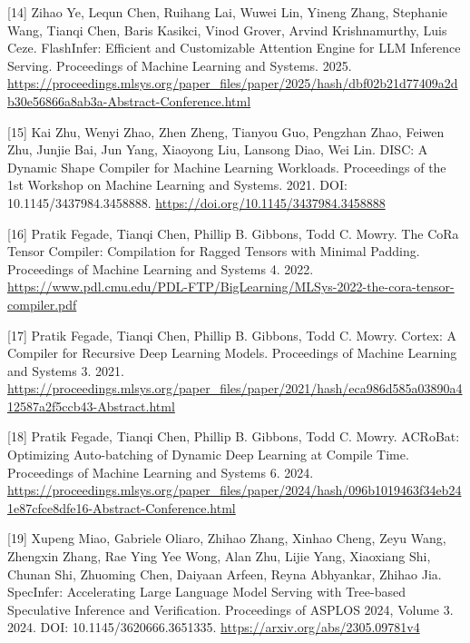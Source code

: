 \documentclass[UTF8,11pt,fontset=windows]{ctexart}
\begin{document}
\leavevmode{}%
{[}14{]} Zihao Ye, Lequn Chen, Ruihang Lai, Wuwei Lin, Yineng Zhang, Stephanie Wang, Tianqi Chen, Baris Kasikci, Vinod Grover, Arvind Krishnamurthy, Luis Ceze. FlashInfer: Efficient and Customizable Attention Engine for LLM Inference Serving. Proceedings of Machine Learning and Systems. 2025. \url{https://proceedings.mlsys.org/paper_files/paper/2025/hash/dbf02b21d77409a2db30e56866a8ab3a-Abstract-Conference.html}

\leavevmode{}%
{[}15{]} Kai Zhu, Wenyi Zhao, Zhen Zheng, Tianyou Guo, Pengzhan Zhao, Feiwen Zhu, Junjie Bai, Jun Yang, Xiaoyong Liu, Lansong Diao, Wei Lin. DISC: A Dynamic Shape Compiler for Machine Learning Workloads. Proceedings of the 1st Workshop on Machine Learning and Systems. 2021. DOI: 10.1145/3437984.3458888. \url{https://doi.org/10.1145/3437984.3458888}

\leavevmode{}%
{[}16{]} Pratik Fegade, Tianqi Chen, Phillip B. Gibbons, Todd C. Mowry. The CoRa Tensor Compiler: Compilation for Ragged Tensors with Minimal Padding. Proceedings of Machine Learning and Systems 4. 2022. \url{https://www.pdl.cmu.edu/PDL-FTP/BigLearning/MLSys-2022-the-cora-tensor-compiler.pdf}

\leavevmode{}%
{[}17{]} Pratik Fegade, Tianqi Chen, Phillip B. Gibbons, Todd C. Mowry. Cortex: A Compiler for Recursive Deep Learning Models. Proceedings of Machine Learning and Systems 3. 2021. \url{https://proceedings.mlsys.org/paper_files/paper/2021/hash/eca986d585a03890a412587a2f5ccb43-Abstract.html}

\leavevmode{}%
{[}18{]} Pratik Fegade, Tianqi Chen, Phillip B. Gibbons, Todd C. Mowry. ACRoBat: Optimizing Auto-batching of Dynamic Deep Learning at Compile Time. Proceedings of Machine Learning and Systems 6. 2024. \url{https://proceedings.mlsys.org/paper_files/paper/2024/hash/096b1019463f34eb241e87cfce8dfe16-Abstract-Conference.html}

\leavevmode{}%
{[}19{]} Xupeng Miao, Gabriele Oliaro, Zhihao Zhang, Xinhao Cheng, Zeyu Wang, Zhengxin Zhang, Rae Ying Yee Wong, Alan Zhu, Lijie Yang, Xiaoxiang Shi, Chunan Shi, Zhuoming Chen, Daiyaan Arfeen, Reyna Abhyankar, Zhihao Jia. SpecInfer: Accelerating Large Language Model Serving with Tree-based Speculative Inference and Verification. Proceedings of ASPLOS 2024, Volume 3. 2024. DOI: 10.1145/3620666.3651335. \url{https://arxiv.org/abs/2305.09781v4}
\end{document}
